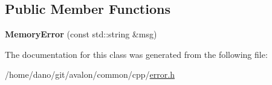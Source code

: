 \subsection*{Public Member Functions}
\begin{DoxyCompactItemize}
\item 
\mbox{\label{classtcf_1_1error_1_1MemoryError_a64d0b1685d0a1ee7da2d2d7a314aa1c7}} 
{\bfseries Memory\+Error} (const std\+::string \&msg)
\end{DoxyCompactItemize}


The documentation for this class was generated from the following file\+:\begin{DoxyCompactItemize}
\item 
/home/dano/git/avalon/common/cpp/\hyperlink{error_8h}{error.\+h}\end{DoxyCompactItemize}

